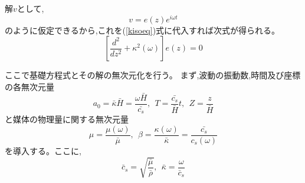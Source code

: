 \documentclass[titlepage]{jsarticle}
\def\dfrac#1#2{{\displaystyle\frac{#1}{#2}}}
\begin{document}
解$v$として,
\begin{equation}
v = e(z)e^{i\omega t} \label{hen}
\end{equation}
のように仮定できるから,これを(\ref{kisoeq})式に代入すれば次式が得られる。
\begin{equation}
\left[ \dfrac{d^2}{dz^2} + \kappa ^2 (\omega ) \right] e(z) = 0 \label{kiso+}
\end{equation}

ここで基礎方程式とその解の無次元化を行う。
まず,波動の振動数,時間及び座標の各無次元量
\begin{equation}
a_0 = \bar{\kappa }\bar{H} = \dfrac{\omega \bar{H}}{\bar{c_s}},~~
T = \dfrac{\bar{c_s}}{\bar{H}} t,~~
Z = \dfrac{z}{\bar{H}} \label{nondim1}
\end{equation}
と媒体の物理量に関する無次元量
\begin{equation}
\mu = \dfrac{\mu (\omega )}{\bar{\mu }},~~
\beta = \dfrac{\kappa (\omega )}{\bar{\kappa }} = 
	\dfrac{\bar{c_s}}{c_s(\omega )} \label{mondim2}
\end{equation}
を導入する。ここに,
\begin{equation}
\bar{c}_s = \sqrt{\dfrac{\bar{\mu }}{\bar{\rho }}},~~
\bar{\kappa } = \dfrac{\omega }{\bar{c}_s} \label{kijun}
\end{equation}
\end{document}
